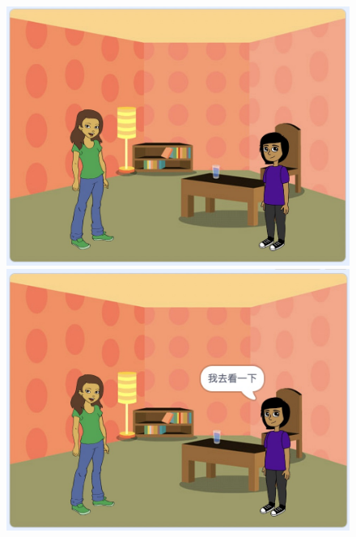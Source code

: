 \documentclass[10pt, a4paper]{article}
\begin{document}
\begin{enumerate}
        \begin{figure}[htb]
            \centering
            \begin{minipage}[t]{.2\textwidth}
                \centering
                \includegraphics[width=\textwidth]{37-1.jpg}
            \end{minipage}
            \begin{minipage}[t]{.2\textwidth}
                \centering
                \includegraphics[width=\textwidth]{37-2.jpg}
            \end{minipage}
            \begin{minipage}[t]{.2\textwidth}
                \centering

\end{minipage}
\end{figure}
\end{enumerate}
\end{document}

